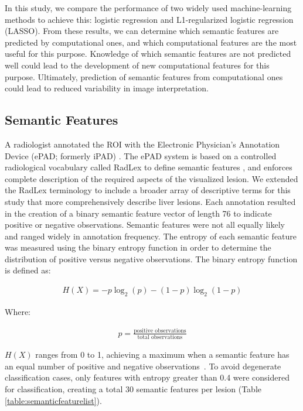 In this study, we compare the performance of two widely used machine-learning methods to achieve this: logistic regression and L1-regularized logistic regression (LASSO). From these results, we can determine which semantic features are predicted by computational ones, and which computational features are the most useful for this purpose. Knowledge of which semantic features are not predicted well could lead to the development of new computational features for this purpose. Ultimately, prediction of semantic features from computational ones could lead to reduced variability in image interpretation.

\subsection{Semantic Features}
A radiologist annotated the ROI with the Electronic Physician's Annotation Device (ePAD; formerly iPAD) \cite{Napel:2010es, Rubin:2008uz}. The ePAD system is based on a controlled radiological vocabulary called RadLex to define semantic features \cite{Korenblum:2011gx, Langlotz:2006jn}, and enforces complete description of the required aspects of the visualized lesion. We extended the RadLex terminology to include a broader array of descriptive terms for this study that more comprehensively describe liver lesions. Each annotation resulted in the creation of a binary semantic feature vector of length 76 to indicate positive or negative observations.
Semantic features were not all equally likely and ranged widely in annotation frequency. The entropy of each semantic feature was measured using the binary entropy function in order to determine the distribution of positive versus negative observations. The binary entropy function is defined as:

\begin{align}
	H(X) = -p\log_2(p) - (1-p)\log_2(1-p)
\end{align}

Where:

\begin{align}
	p = \frac{\textrm{positive observations}}{\textrm{total observations}}
\end{align}

$H(X)$ ranges from 0 to 1, achieving a maximum when a semantic feature has an equal number of positive and negative observations~\cite{MacKay:2003wc}. To avoid degenerate classification cases, only features with entropy greater than 0.4 were considered for classification, creating a total 30 semantic features per lesion (Table \ref{table:semanticfeaturelist}).

